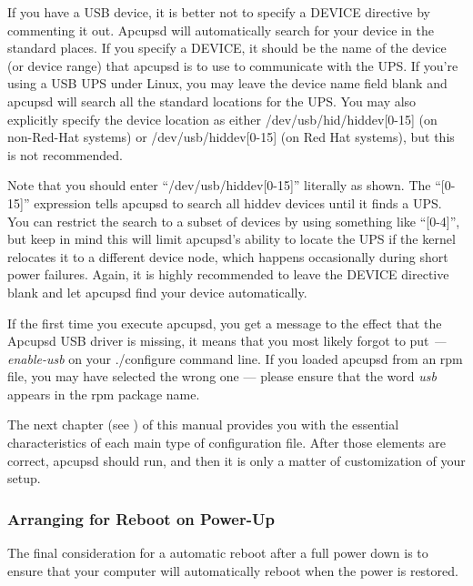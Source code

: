 If you have a USB device, it is better not to specify a DEVICE directive by
commenting it out. Apcupsd will automatically search for your device in the
standard places. If you specify a DEVICE, it should be the name of the device
(or device range) that apcupsd is to use to communicate with the UPS.  If
you're using a USB UPS under Linux, you may leave the device name field blank
and apcupsd will search all the standard locations for the UPS. You may also
explicitly specify the device location as either /dev/usb/hid/hiddev[0-15] (on
non-Red-Hat systems) or /dev/usb/hiddev[0-15] (on Red Hat systems), but this
is not recommended.  

Note that you should enter ``/dev/usb/hiddev[0-15]'' literally as shown.  The
``[0-15]'' expression tells apcupsd to search all hiddev devices until it
finds a UPS. You can restrict the search to a subset of devices by using
something like ``[0-4]'', but keep in mind this will limit apcupsd's ability
to locate the UPS if the kernel relocates it to a different device node, which
happens occasionally during short power failures. Again, it is highly
recommended to leave the DEVICE directive blank and let apcupsd find your
device automatically.  

If the first time you execute apcupsd, you get a message to the effect that
the Apcupsd USB driver is missing, it means that you most likely forgot to put
{\it {---}enable-usb} on your ./configure command line. If you loaded apcupsd
from an rpm file, you may have selected the wrong one {---} please ensure that
the word {\it usb} appears in the rpm package name.  

The next chapter (see 
) of this
manual provides you with the essential characteristics of each main type of
configuration file.  After those elements are correct, apcupsd should run, and
then it is only a matter of customization of your setup. 

\label{Arranging-for-Reboot-on-Power_002dUp}

\subsubsection*{Arranging for Reboot on Power-Up}

\label{index-Reboot-on-power-up-60}
\label{index-Power-up_002c-reboot-61}
The final consideration for a automatic reboot after a full power down is to
ensure that your computer will automatically reboot when the power is
restored.  

